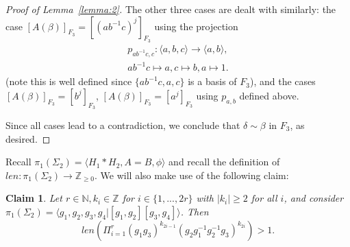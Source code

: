 \documentclass[11pt]{article}
\newenvironment{myequation}
    {
        \begin{equation*}
        \begin{gathered}
    }
    { 
        \end{gathered} 
        \end{equation*}
    }
\newtheorem{claim}[theorem]{Claim}
\newcommand{\N}{\mathbb{N}}
\newcommand{\Z}{\mathbb{Z}}
\begin{document}
\begin{proof}[Proof of Lemma~\ref{lemma:2}]
        The other three cases are dealt with similarly: the case $[A(\beta)]_{F_3} = [(ab^{-1}c)^j]_{F_3}$ using the projection
        \begin{myequation}
            p_{ab^{-1}c,c} : \langle a,b,c \rangle \to \langle a,b \rangle ,\\
            ab^{-1}c \mapsto a, c \mapsto b, a \mapsto 1 .
        \end{myequation}
        (note this is well defined since $\{ab^{-1}c, a, c\}$ is a basis of $F_3$), and the cases $[A(\beta)]_{F_3} = [b^j]_{F_3}$, $[A(\beta)]_{F_3} = [a^j]_{F_3}$ using $p_{a,b}$ defined above.
        
        Since all cases lead to a contradiction, we conclude that $\delta \sim \beta$ in $F_3$, as desired. 
    \end{proof}
    
    Recall $\pi_1(\Sigma_2) = \langle H_1*H_2 , A=B , \phi \rangle$ and recall the definition of $len: \pi_1(\Sigma_2) \to \Z_{\geq 0}$. We will also make use of the following claim:
    \begin{claim}
    \label{cl:length}
        Let $r \in \N, k_i \in \Z$ for $i \in \{1,...,2r\}$ with $|k_i| \geq 2$ for all $i$, and consider $\pi_1(\Sigma_2) = \langle g_1,g_2,g_3,g_4 | [g_1,g_2][g_3,g_4] \rangle$. Then
        \[
            len \left( \Pi_{i=1}^r (g_1 g_3)^{k_{2i-1}} (g_2 g_1^{-1} g_2^{-1}g_3)^{k_{2i}} \right) > 1 .
        \]
    \end{claim}
    
\end{document}
